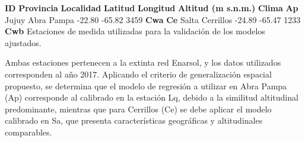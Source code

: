 \documentclass[letterpaper,12pt, twoside]{report}
\providecommand{\DIFdeltex}[1]{{\protect\color{red} \scriptsize #1}} %
\providecommand{\DIFdelFL}[1]{\DIFdel{#1}} %
\providecommand{\DIFdel}[1]{\texorpdfstring{\DIFdeltex{#1}}{}} %
\begin{document}
\DIFdelFL{\textbf{ID} }%
\DIFdelFL{\textbf{Provincia} }%
\DIFdelFL{\textbf{Localidad} }%
\DIFdelFL{\textbf{Latitud} }%
\DIFdelFL{\textbf{Longitud} }%
\DIFdelFL{\textbf{Altitud (m s.n.m.)} }%
\DIFdelFL{\textbf{Clima}}%
\DIFdelFL{\textbf{Ap} }%
\DIFdelFL{Jujuy }%
\DIFdelFL{Abra Pampa }%
\DIFdelFL{-22.80 }%
\DIFdelFL{-65.82 }%
\DIFdelFL{3459 }%
\DIFdelFL{\textbf{Cwa}}%
\DIFdelFL{\textbf{Ce} }%
\DIFdelFL{Salta }%
\DIFdelFL{Cerrillos  }%
\DIFdelFL{-24.89 }%
\DIFdelFL{-65.47 }%
\DIFdelFL{1233 }%
\DIFdelFL{\textbf{Cwb}}%
{%
\DIFdelFL{Estaciones de medida utilizadas para la validación de los modelos ajustados.}}

\DIFdel{Ambas estaciones pertenecen a la extinta red Enarsol, y los datos utilizados corresponden al año 2017. Aplicando el criterio de generalización espacial propuesto, se determina que el modelo de regresión a utilizar en Abra Pampa (Ap) corresponde al calibrado en la estación Lq, debido a la similitud altitudinal predominante, mientras que para Cerrillos (Ce) se debe aplicar el modelo calibrado en Sa, que presenta características geográficas y altitudinales comparables.
}%
\end{document}

